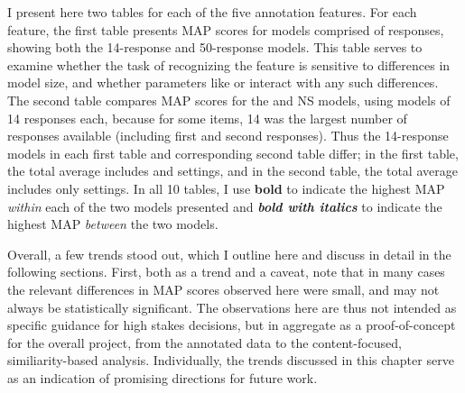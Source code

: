 I present here two tables for each of the five annotation features. For each feature, the first table presents MAP scores for models comprised of  responses, showing both the 14-response and 50-response models. This table serves to examine whether the task of recognizing the feature is sensitive to differences in model size, and whether parameters like  or  interact with any such differences. The second table compares MAP scores for the  and  NS models, using models of 14 responses each,
 because for some items, 14 was the largest number of  responses available (including first and second responses). Thus the  14-response models in each first table and corresponding second table differ; in the first table, the total average includes  and  settings, and in the second table, the total average includes only  settings. In all 10 tables, I use \textbf{bold} to indicate the highest  MAP \textit{within} each of the two models presented and \textit{\textbf{bold with italics}} to indicate the highest MAP \textit{between} the two models.

Overall, a few trends stood out, which I outline here and discuss in detail in the following sections. First, both as a trend and a caveat, note that in many cases the relevant differences in MAP scores observed here were small, and may not always be statistically significant.
The observations here are thus not intended as specific guidance for high stakes decisions, but in aggregate as a proof-of-concept for the overall project, from the annotated data to the content-focused, similiarity-based analysis. Individually, the trends discussed in this chapter serve as an indication of promising directions for future work. 

